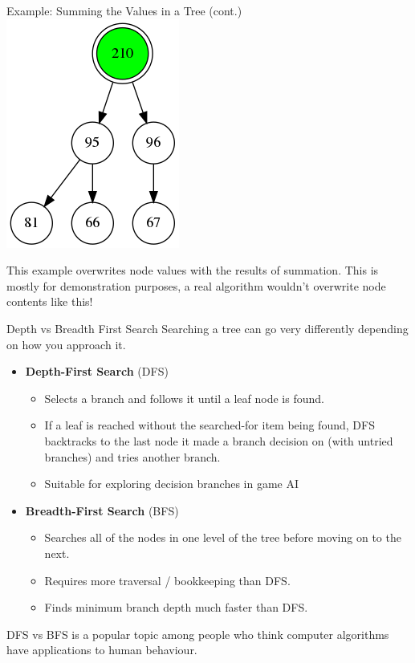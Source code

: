\documentclass[11pt]{beamer}
\begin{document}
\begin{frame}{Example: Summing the Values in a Tree (cont.)}
\includegraphics[scale=0.28]{summing_tree_10.png}

This example overwrites node values with the results of summation.  This is mostly for demonstration purposes, a real algorithm wouldn't overwrite node contents like this! 
\end{frame}

\begin{frame}{Depth vs Breadth First Search}
Searching a tree can go very differently depending on how you approach it.
\begin{itemize}
\item \textbf{Depth-First Search} (DFS)
\begin{itemize}
\item Selects a branch and follows it until a leaf node is found.
\item If a leaf is reached without the searched-for item being found, DFS backtracks to the last node it made a branch decision on (with untried branches) and tries another branch.
\item Suitable for exploring decision branches in game AI
\end{itemize}
\item \textbf{Breadth-First Search} (BFS)
\begin{itemize}
\item Searches all of the nodes in one level of the tree before moving on to the next.  
\item Requires more traversal / bookkeeping than DFS.
\item Finds minimum branch depth much faster than DFS.  
\end{itemize}
\end{itemize}
DFS vs BFS is a popular topic among people who think computer algorithms have applications to human behaviour.  
\end{frame}
\end{document}
